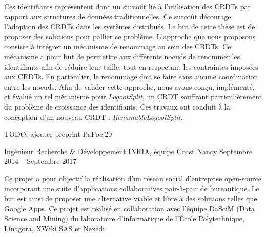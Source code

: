 \documentclass[12pt, a4paper]{awesome-cv}
\begin{document}
\begin{cventries}
\begin{cvparagraph}
  Ces identifiants représentent donc un surcoût lié à l'utilisation des \acp{CRDT} par rapport aux structures de données traditionnelles.
  Ce surcoût décourage l'adoption des \acp{CRDT} dans les systèmes distribués.
  Le but de cette thèse est de proposer des solutions pour pallier ce problème.
  L'approche que nous proposons consiste à intégrer un mécanisme de renommage au sein des \acp{CRDT}.
  Ce mécanisme a pour but de permettre aux différents noeuds de renommer les identifiants afin de réduire leur taille, tout en respectant les contraintes imposées aux \acp{CRDT}.
  En particulier, le renommage doit se faire sans aucune coordination entre les noeuds.
  Afin de valider cette approche, nous avons conçu, implémenté, et évalué un tel mécanisme pour \emph{LogootSplit}, un \ac{CRDT} souffrant particulièrement du problème de croissance des identifiants.
  Ces travaux ont conduit à la conception d'un nouveau \ac{CRDT} : \emph{RenamableLogootSplit}.

  \begin{description}[labelindent=1.6em,itemsep=-0.3em]
    \item TODO: ajouter preprint PaPoc'20
    \item {}
  \end{description}
\end{cvparagraph}

\cventry
  {Ingénieur Recherche \& Développement} %
  {INRIA, équipe Coast} %
  {Nancy} %
  {Septembre 2014 – Septembre 2017} %
  {}


  \begin{cvparagraph}
    Ce projet a pour objectif la réalisation d'un réseau social d'entreprise open-source incorporant une suite d'applications collaboratives pair-à-pair de bureautique.
    Le but est ainsi de proposer une alternative viable et libre à des solutions telles que Google Apps. Ce projet est réalisé en collaboration avec l’équipe DaSciM (Data Science and Mining) du laboratoire d’informatique de l’École Polytechnique, Linagora, XWiki SAS et Nexedi.


\end{cvparagraph}
\end{cventries}
\end{document}
